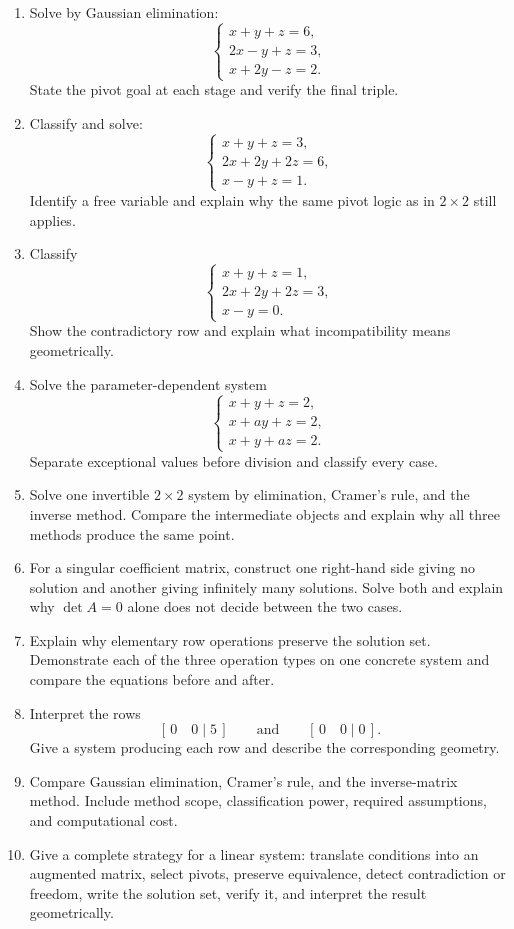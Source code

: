 \begin{enumerate}
\item Solve by Gaussian elimination:
\[
\begin{cases}
x+y+z=6,\\
2x-y+z=3,\\
x+2y-z=2.
\end{cases}
\]
State the pivot goal at each stage and verify the final triple.

\item Classify and solve:
\[
\begin{cases}
x+y+z=3,\\
2x+2y+2z=6,\\
x-y+z=1.
\end{cases}
\]
Identify a free variable and explain why the same pivot logic as in $2\times2$ still applies.

\item Classify
\[
\begin{cases}
x+y+z=1,\\
2x+2y+2z=3,\\
x-y=0.
\end{cases}
\]
Show the contradictory row and explain what incompatibility means geometrically.

\item Solve the parameter-dependent system
\[
\begin{cases}
x+y+z=2,\\
x+ay+z=2,\\
x+y+az=2.
\end{cases}
\]
Separate exceptional values before division and classify every case.

\item Solve one invertible $2\times2$ system by elimination, Cramer's rule, and the inverse method. Compare the intermediate objects and explain why all three methods produce the same point.

\item For a singular coefficient matrix, construct one right-hand side giving no solution and another giving infinitely many solutions. Solve both and explain why $\det A=0$ alone does not decide between the two cases.

\item Explain why elementary row operations preserve the solution set. Demonstrate each of the three operation types on one concrete system and compare the equations before and after.

\item Interpret the rows
\[
[\,0\quad0\mid5\,]
\qquad\text{and}\qquad
[\,0\quad0\mid0\,].
\]
Give a system producing each row and describe the corresponding geometry.

\item Compare Gaussian elimination, Cramer's rule, and the inverse-matrix method. Include method scope, classification power, required assumptions, and computational cost.

\item Give a complete strategy for a linear system: translate conditions into an augmented matrix, select pivots, preserve equivalence, detect contradiction or freedom, write the solution set, verify it, and interpret the result geometrically.
\end{enumerate}
